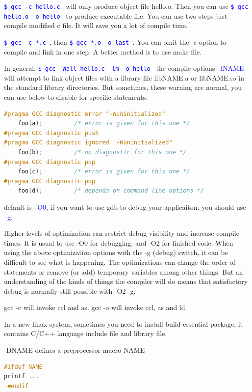 \documentclass[paper=8.5in:11in, twoside, 12pt, pagesize=pdftex]{book}
\newcommand{\linuxcommand}[1]{\texttt{\textcolor{blue}{\$ #1 \Pisymbol{psy}{191}}}}
\newcommand{\op}[1]{\textcolor{blue}{-#1}}
\begin{document}
   \linuxcommand{gcc -c hello.c} will only produce object file hello.o. Then you can use \linuxcommand{gcc hello.o -o hello} to produce executable file. You can use two steps just compile modified c file. It will save you a lot of compile time.
   
   \linuxcommand{gcc -c *.c}, then \linuxcommand{gcc *.o -o last}. You can omit the -c option to compile and link in one step. A better method is to use make file.

   In general, \linuxcommand{gcc -Wall hello.c -lm -o hello} the compile options \op{-lNAME} will attempt to link object files with a library file libNAME.a or libNAME.so in the standard library directories. But sometimes, these warning are normal, you can use below to disable for specific statements.

\begin{lstlisting}[frame=single, language=c++]
#pragma GCC diagnostic error "-Wuninitialized"
    foo(a);         /* error is given for this one */
#pragma GCC diagnostic push
#pragma GCC diagnostic ignored "-Wuninitialized"
    foo(b);         /* no diagnostic for this one */
#pragma GCC diagnostic pop
    foo(c);         /* error is given for this one */
#pragma GCC diagnostic pop
    foo(d);         /* depends on command line options */
\end{lstlisting}

default is \op{-O0}, if you want to use gdb to debug your applicaiton, you should use \op{-g}.

 Higher levels of optimization can restrict debug visibility and increase compile times. It is usual to use -O0 for debugging, and -O2 for finished code. When using the above optimization options with the -g (debug) switch, it can be difficult to see what is happening. The optimizations can change the order of statements or remove (or add) temporary variables among other things. But an understanding of the kinds of things the compiler will do means that satisfactory debug is normally still possible with -O2 -g.

 gcc -c will invoke ccl and as. gcc -o will invoke ccl, as and ld.

	In a new linux system, sometimes you need to install build-essential package,  it contains C/C++ language include file and library file.

-DNAME defines a preprocessor macro NAME
 
\begin{lstlisting}[frame=single, language=c++]
#ifdef NAME
printf ...
 #endif
\end{lstlisting}
\end{document}
